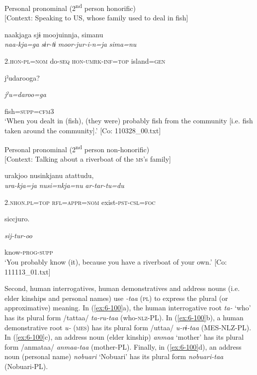 \begin{table}
\ex Personal pronominal (2\textsuperscript{nd} person honorific)\\{}
[Context: Speaking to US, whose family used to deal in fish]

{\TM}
\glll naakjaga  sjɨ  moojuinnja,  simanu\\

      \textit{naa-kja=ga}  \textit{sɨr-tɨ}  \textit{moor-jur-i-n=ja}  \textit{sima=nu}

      2.\textsc{hon}-\textsc{pl}=\textsc{nom}  do-\textsc{seq}  \textsc{hon}-\textsc{umrk}-\textsc{inf}=\textsc{top}  island=\textsc{gen}

      jˀudarooga?

      \textit{jˀu=daroo=ga}

      fish=\textsc{supp}=\textsc{cfm}3\\
\glt ‘When you dealt in (fish), (they were) probably fish from the community [i.e. fish taken around the community].’ [Co: 110328\_00.txt]
\z

\ex Personal pronominal (2\textsuperscript{nd} person non-honorific)\\{}
[Context: Talking about a riverboat of the \textsc{ms}’s family]

{\TM}
\glll urakjoo  nusinkjanu  atattudu,\\

      \textit{ura-kja=ja}  \textit{nusi=nkja=nu}  \textit{ar-tar-tu=du}

      2.\textsc{nhon}.\textsc{pl}=\textsc{top}  \textsc{rfl}=\textsc{appr}=\textsc{nom}  exist-\textsc{pst}-\textsc{csl}=\textsc{foc}

      siccjuro.

      \textit{sij-tur-oo}

      know-\textsc{prog}-\textsc{supp}\\
\glt ‘You probably know (it), because you have a riverboat of your own.’ [Co: 111113\_01.txt]
\z

  Second, human interrogatives, human demonstratives and address nouns (i.e. elder kinships and personal names) use \textit{-taa} (\textsc{pl}) to express the plural (or approximative) meaning. In (\ref{ex:6-100}a), the human interrogative root \textit{ta-} ‘who’ has its plural form /tattaa/ \textit{ta-ru-taa} (who-\textsc{nlz}-PL). In (\ref{ex:6-100}b), a human demonstrative root \textit{u-} (\textsc{mes}) has its plural form /uttaa/ \textit{u-rɨ-taa} (MES-NLZ-PL). In (\ref{ex:6-100}c), an address noun (elder kinship) \textit{anmaa} ‘mother’ has its plural form /anmataa/ \textit{anmaa-taa} (mother-PL). Finally, in (\ref{ex:6-100}d), an address noun (personal name) \textit{nobuari} ‘Nobuari’ has its plural form \textit{nobuari-taa} (Nobuari-PL).


\end{table}
